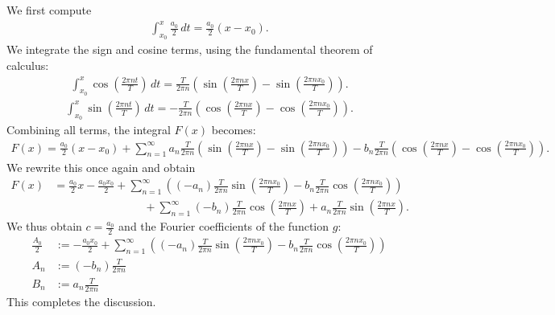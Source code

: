 \documentclass[11pt]{article}
\begin{document}
\begin{solution}
    We first compute 
    \begin{gather*}
        \int_{x_0}^x \frac{a_0}{2} \, dt = \frac{a_0}{2} (x - x_0).
    \end{gather*}
    We integrate the sign and cosine terms, using the fundamental theorem of calculus:
    \begin{gather*}
        \int_{x_0}^x \cos\left(\frac{2\pi n t}{T}\right) \, dt 
        = 
        \frac{T}{2\pi n} \left( \sin\left(\frac{2\pi n x}{T}\right) - \sin\left(\frac{2\pi n x_0}{T}\right) \right).
    \end{gather*}
    \begin{gather*}
        \int_{x_0}^x \sin\left(\frac{2\pi n t}{T}\right) \, dt 
        = 
        -\frac{T}{2\pi n} \left( \cos\left(\frac{2\pi n x}{T}\right) - \cos\left(\frac{2\pi n x_0}{T}\right) \right).
    \end{gather*}
    Combining all terms, the integral \( F(x) \) becomes:
    \begin{gather*}
        F(x) 
        = 
        \frac{a_0}{2} (x - x_0) 
        + 
        \sum_{n=1}^\infty 
        a_n \frac{T}{2\pi n} \left( \sin\left(\frac{2\pi n x}{T}\right) - \sin\left(\frac{2\pi n x_0}{T}\right) \right) 
        - 
        b_n \frac{T}{2\pi n} \left( \cos\left(\frac{2\pi n x}{T}\right) - \cos\left(\frac{2\pi n x_0}{T}\right) \right).
    \end{gather*}
    We rewrite this once again and obtain
    \begin{align*}
        F(x) 
        &
        = 
        \frac{a_0}{2} x 
        - 
        \frac{a_0 x_0 }{2}
        + 
        \sum_{n=1}^\infty 
        \left( 
        (-a_n) \frac{T}{2\pi n} \sin\left(\frac{2\pi n x_0}{T}\right) 
        - 
        b_n \frac{T}{2\pi n} \cos\left(\frac{2\pi n x_0}{T}\right) 
        \right)
        \\&\qquad\qquad\qquad\qquad 
        + 
        \sum_{n=1}^\infty 
        (-b_n) \frac{T}{2\pi n} \cos\left(\frac{2\pi n x}{T}\right)
        + 
        a_n \frac{T}{2\pi n} \sin\left(\frac{2\pi n x}{T}\right) 
        .
    \end{align*}
    We thus obtain $c = \frac{a_0}{2}$ and the Fourier coefficients of the function $g$:
    \begin{align*}
        \frac{A_0}{2} &:= -\frac{a_0 x_0 }{2}
        + 
        \sum_{n=1}^\infty 
        \left( 
        (-a_n) \frac{T}{2\pi n} \sin\left(\frac{2\pi n x_0}{T}\right) 
        - 
        b_n \frac{T}{2\pi n} \cos\left(\frac{2\pi n x_0}{T}\right) 
        \right)
        \\
        A_n &:= (-b_n) \frac{T}{2\pi n} 
        \\
        B_n &:= a_n \frac{T}{2\pi n} 
    \end{align*}
    This completes the discussion. 
\end{solution}
\end{document}
